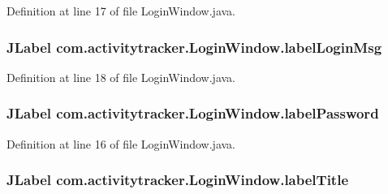 Definition at line 17 of file Login\+Window.\+java.

\subsubsection[{\texorpdfstring{label\+Login\+Msg}{labelLoginMsg}}]{\setlength{\rightskip}{0pt plus 5cm}J\+Label com.\+activitytracker.\+Login\+Window.\+label\+Login\+Msg\hspace{0.3cm}{\ttfamily [private]}}\hypertarget{classcom_1_1activitytracker_1_1_login_window_a567ae49b39c07840b39eec92fdf92c22}{}\label{classcom_1_1activitytracker_1_1_login_window_a567ae49b39c07840b39eec92fdf92c22}


Definition at line 18 of file Login\+Window.\+java.

\subsubsection[{\texorpdfstring{label\+Password}{labelPassword}}]{\setlength{\rightskip}{0pt plus 5cm}J\+Label com.\+activitytracker.\+Login\+Window.\+label\+Password\hspace{0.3cm}{\ttfamily [private]}}\hypertarget{classcom_1_1activitytracker_1_1_login_window_a8be41422fca8038bd8c2ba49af8ae6ce}{}\label{classcom_1_1activitytracker_1_1_login_window_a8be41422fca8038bd8c2ba49af8ae6ce}


Definition at line 16 of file Login\+Window.\+java.

\subsubsection[{\texorpdfstring{label\+Title}{labelTitle}}]{\setlength{\rightskip}{0pt plus 5cm}J\+Label com.\+activitytracker.\+Login\+Window.\+label\+Title\hspace{0.3cm}{\ttfamily [private]}}\hypertarget{classcom_1_1activitytracker_1_1_login_window_a3c4c84a656351094b34320a5c352e685}{}\label{classcom_1_1activitytracker_1_1_login_window_a3c4c84a656351094b34320a5c352e685}


